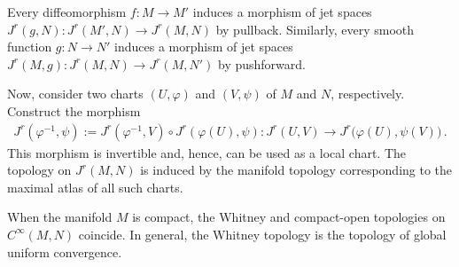 
    \begin{property}[Topology]
        Every diffeomorphism $f:M\rightarrow M'$ induces a morphism of jet spaces $J^r(g,N):J^r(M',N)\rightarrow J^r(M,N)$ by pullback. Similarly, every smooth function $g:N\rightarrow N'$ induces a morphism of jet spaces $J^r(M,g):J^r(M,N)\rightarrow J^r(M,N')$ by pushforward.

        Now, consider two charts $(U,\varphi)$ and $(V,\psi)$ of $M$ and $N$, respectively. Construct the morphism
        \begin{gather}
            J^r(\varphi^{-1},\psi):=J^r(\varphi^{-1},V)\circ J^r(\varphi(U),\psi):J^r(U,V)\rightarrow J^r\bigl(\varphi(U),\psi(V)\bigr)\,.
        \end{gather}
        This morphism is invertible and, hence, can be used as a local chart. The topology on $J^r(M,N)$ is induced by the manifold topology corresponding to the maximal atlas of all such charts.
    \end{property}
    \begin{property}
        When the manifold $M$ is compact, the Whitney and compact-open topologies on $C^\infty(M,N)$ coincide. In general, the Whitney topology is the topology of global uniform convergence.
    \end{property}

